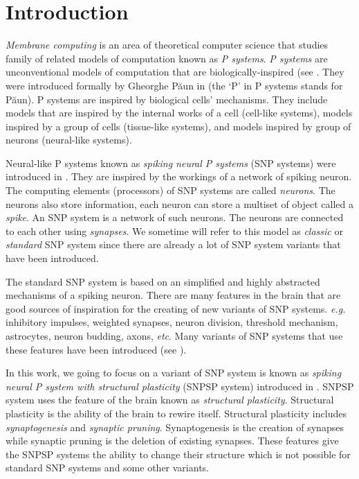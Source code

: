 \documentclass[smallextended]{svjour3}
\begin{document}

\section{Introduction}

\textit{Membrane computing} is an area of theoretical computer science that studies family of related models of computation known as \textit{P systems}.
\textit{P systems} are unconventional models of computation that are biologically-inspired (see \cite{HANDBOOK}. They were introduced formally by 
Gheorghe P\u{a}un in \cite{mc} (the `P' in P systems stands for P\u{a}un). P systems are inspired by biological cells' mechanisms. They include models
that are inspired by the internal works of a cell (cell-like systems), models inspired by a group of cells (tissue-like systems), and models inspired 
by group of neurons (neural-like systems).


Neural-like P systems known as \textit{spiking neural P systems} (SNP systems) were introduced in \cite{SNP}. They are inspired by the workings of a
network of spiking neuron. The computing elements (processors) of SNP systems are called \textit{neurons}. The neurons also store information, each
neuron can store a multiset of object called a \textit{spike}. An SNP system is a network of such neurons. The neurons are connected to each other 
using \textit{synapses}. We sometime will refer to this model as \textit{classic} or \textit{standard} SNP system since there are already a lot of
SNP system variants that have been introduced.

The standard SNP system is based on an simplified and highly abstracted mechanisms of a spiking neuron. There are many features in the brain that are 
good sources of inspiration for the creating of new variants of SNP systems. \textit{e.g.} inhibitory impulses, weighted synapses, neuron division, 
threshold mechanism, astrocytes, neuron budding, axons, \emph{etc}. Many variants of SNP systems that use these features have been introduced (see 
\cite{pan-snpweight-2012,paun-astroc-snp-2007,song-snp-syn-2014,wang-snpweights-2010,pan-anti-snp-2009,pan-astro-snp-2012,wu-cellsnp-2016,SNPwT,song-pan-rulsyn-maxspik-2015,AXONP}).

In this work, we going to focus on a variant of SNP system is known as \textit{spiking neural P system with structural plasticity} (SNPSP system) 
introduced in \cite{SNPSP}. SNPSP system uses the feature of the brain known as  \textit{structural plasticity}. Structural plasticity is the ability
of the brain to rewire itself. Structural plasticity includes \textit{synaptogenesis} and \textit{synaptic pruning}. Synaptogenesis is the creation of 
synapses while synaptic pruning is the deletion of existing synapses. These features give the SNPSP systems the ability to change their structure 
which is not possible for standard SNP systems and some other variants.
\end{document}
